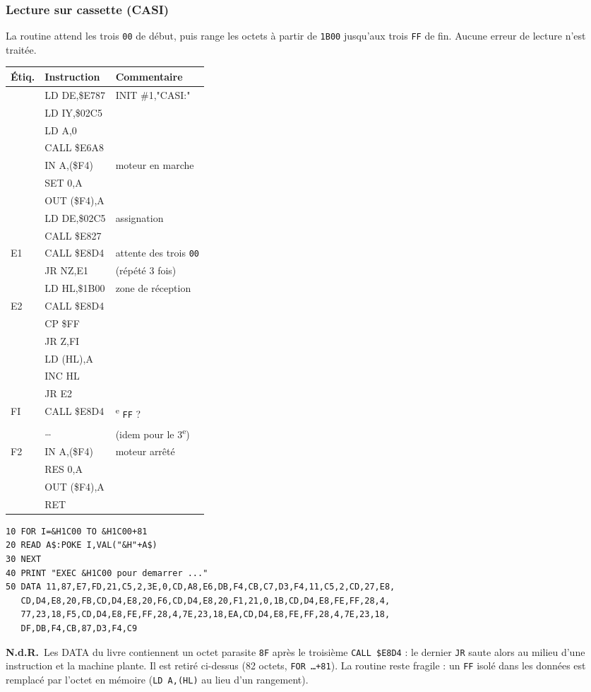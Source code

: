 \documentclass[a4paper,10pt]{article}
\makeatletter
\newcommand{\hex}[1]{\texttt{#1}}
\newcommand{\nota}[1]{\textcolor{red!60!black}{\small\textbf{N.d.R.}~#1}}
\newenvironment{src}
  {\small\begin{longtable}{@{}>{\ttfamily}l>{\ttfamily}l>{\raggedright\arraybackslash}p{8.6cm}@{}}
   \toprule
   \normalfont\bfseries Étiq. & \normalfont\bfseries Instruction & \textbf{Commentaire}\\
   \midrule\endhead
   \bottomrule\endfoot}
  {\end{longtable}}
\makeatother
\begin{document}
\subsubsection*{Lecture sur cassette (CASI)}
La routine attend les trois \hex{00} de début, puis range les octets à partir
de \hex{1B00} jusqu'aux trois \hex{FF} de fin. Aucune erreur de lecture n'est
traitée.
\begin{src}
 & LD DE,\$E787 & INIT \#1,"CASI:" \\
 & LD IY,\$02C5 & \\
 & LD A,0 & \\
 & CALL \$E6A8 & \\
 & IN A,(\$F4) & moteur en marche \\
 & SET 0,A & \\
 & OUT (\$F4),A & \\
 & LD DE,\$02C5 & assignation \\
 & CALL \$E827 & \\
E1 & CALL \$E8D4 & attente des trois \hex{00} \\
 & JR NZ,E1 & (répété 3 fois) \\
 & LD HL,\$1B00 & zone de réception \\
E2 & CALL \$E8D4 & \\
 & CP \$FF & \\
 & JR Z,FI & \\
 & LD (HL),A & \\
 & INC HL & \\
 & JR E2 & \\
FI & CALL \$E8D4 & 2\textsuperscript{e} \hex{FF} ? \\
 & \dots & (idem pour le 3\textsuperscript{e}) \\
F2 & IN A,(\$F4) & moteur arrêté \\
 & RES 0,A & \\
 & OUT (\$F4),A & \\
 & RET & \\
\end{src}
\begin{verbatim}
10 FOR I=&H1C00 TO &H1C00+81
20 READ A$:POKE I,VAL("&H"+A$)
30 NEXT
40 PRINT "EXEC &H1C00 pour demarrer ..."
50 DATA 11,87,E7,FD,21,C5,2,3E,0,CD,A8,E6,DB,F4,CB,C7,D3,F4,11,C5,2,CD,27,E8,
   CD,D4,E8,20,FB,CD,D4,E8,20,F6,CD,D4,E8,20,F1,21,0,1B,CD,D4,E8,FE,FF,28,4,
   77,23,18,F5,CD,D4,E8,FE,FF,28,4,7E,23,18,EA,CD,D4,E8,FE,FF,28,4,7E,23,18,
   DF,DB,F4,CB,87,D3,F4,C9
\end{verbatim}
\nota{Les DATA du livre contiennent un octet parasite \hex{8F} après le
troisième \texttt{CALL \$E8D4} : le dernier \texttt{JR} saute alors au milieu
d'une instruction et la machine plante. Il est retiré ci-dessus (82 octets,
\texttt{FOR \dots +81}). La routine reste fragile : un \hex{FF} isolé dans
les données est remplacé par l'octet en mémoire (\texttt{LD A,(HL)} au lieu
d'un rangement).}
\end{document}
